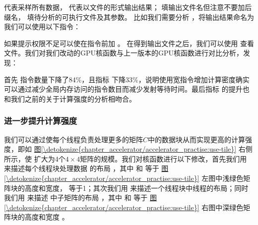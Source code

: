 \documentclass[letterpaper,10pt,english]{sphinxmanual}
\begin{document}
\sphinxAtStartPar
{} 代表采样所有数据，  代表以文件的形式输出结果；
 填输出文件名但注意不要加后缀名，
 填待分析的可执行文件及其参数。 比如我们需要分析
 ，将输出结果命名为 
我们可以使用以下指令：

\begin{sphinxVerbatim}[commandchars=\\\{\}]
\end{sphinxVerbatim}

\sphinxAtStartPar
如果提示权限不足可以使在指令前加 。
在得到输出文件之后，我们可以使用 
查看文件。我们对我们改动的GPU核函数与上一版本的GPU核函数进行对比分析，发现：

\sphinxAtStartPar
首先  指令数量下降了84\%，且指标 
下降33\%，说明使用宽指令增加计算密度确实可以通过减少全局内存访问的指令数目而减少发射等待时间。最后指标
 的提升也和我们之前的关于计算强度的分析相吻合。


\subsubsection{进一步提升计算强度}
\label{\detokenize{chapter_accelerator/accelerator_practise:id7}}
\sphinxAtStartPar
我们可以通过使每个线程负责处理更多的矩阵\(C\)中的数据块从而实现更高的计算强度，即如
\hyperref[\detokenize{chapter_accelerator/accelerator_practise:use-tile}]{图\ref{\detokenize{chapter_accelerator/accelerator_practise:use-tile}}} 右侧所示，使 
扩大为4个\(4 \times 4\)矩阵的规模。我们对核函数进行以下修改，首先我们用
来描述每个线程块处理数据 的布局 ，其中  和
 等于 \hyperref[\detokenize{chapter_accelerator/accelerator_practise:use-tile}]{图\ref{\detokenize{chapter_accelerator/accelerator_practise:use-tile}}}
左图中浅绿色矩阵块的高度和宽度， 
等于1；其次我们用
来描述一个线程块中线程的布局；同时我们用 来描述
 中子矩阵的布局 ，其中 和
 等于 \hyperref[\detokenize{chapter_accelerator/accelerator_practise:use-tile}]{图\ref{\detokenize{chapter_accelerator/accelerator_practise:use-tile}}}
右图中深绿色矩阵块的高度和宽度 。
\end{document}
